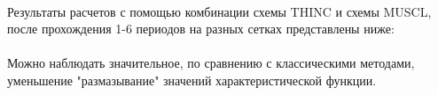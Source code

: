 \documentclass[12pt,a4paper]{article}
\begin{document}
\medskip
\\
Результаты расчетов с помощью комбинации схемы THINC и схемы MUSCL, после прохождения 1-6 периодов на разных сетках представлены ниже:
\\
\medskip
\\
Можно наблюдать значительное, по сравнению с классическими методами, уменьшение "размазывание" значений характеристической функции.
\end{document}
